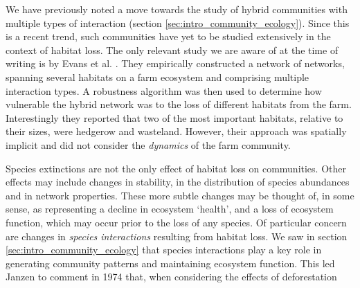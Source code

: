 We have previously noted a move towards the study of hybrid communities with multiple types of interaction (section \ref{sec:intro_community_ecology}). Since this is a recent trend, such communities have yet to be studied extensively in the context of habitat loss. The only relevant study we are aware of at the time of writing is by Evans et al. \cite{evans2013robustness}. They empirically constructed a network of networks, spanning several habitats on a farm ecosystem and comprising multiple interaction types. A robustness algorithm was then used to determine how vulnerable the hybrid network was to the loss of different habitats from the farm. Interestingly they reported that two of the most important habitats, relative to their sizes, were hedgerow and wasteland. However, their approach was spatially implicit and did not consider the \emph{dynamics} of the farm community. 

Species extinctions are not the only effect of habitat loss on communities. Other effects may include changes in stability, in the distribution of species abundances and in network properties. These more subtle changes may be thought of, in some sense, as representing a decline in ecosystem `health', and a loss of ecosystem function, which may occur prior to the loss of any species. Of particular concern are changes in \emph{species interactions} resulting from habitat loss. We saw in section \ref{sec:intro_community_ecology} that species interactions play a key role in generating community patterns and maintaining ecosystem function. This led Janzen to comment in 1974 that, when considering the effects of deforestation

